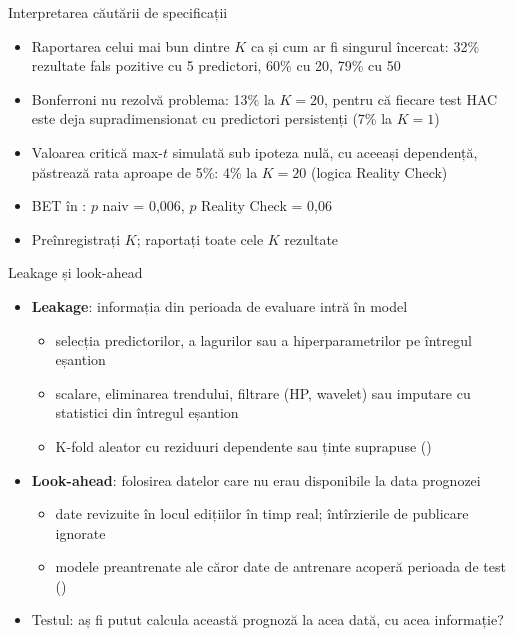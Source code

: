 \begin{frame}{Interpretarea căutării de specificații}
\itemsize{\small}
\begin{itemize}
    \item Raportarea celui mai bun dintre $K$ ca și cum ar fi singurul încercat: 32\% rezultate fals pozitive cu 5 predictori, 60\% cu 20, 79\% cu 50
    \item Bonferroni nu rezolvă problema: 13\% la $K = 20$, pentru că fiecare test HAC este deja supradimensionat cu predictori persistenți (7\% la $K = 1$)
    \item Valoarea critică max-$t$ simulată sub ipoteza nulă, cu aceeași dependență, păstrează rata aproape de 5\%: 4\% la $K = 20$ (logica Reality Check)
    \item BET în : $p$ naiv = 0{,}006, $p$ Reality Check = 0{,}06
    \item Preînregistrați $K$; raportați toate cele $K$ rezultate
\end{itemize}
\end{frame}

\begin{frame}{Leakage și look-ahead}
\itemsize{\small}
\begin{itemize}
    \item \textbf{Leakage}: informația din perioada de evaluare intră în model 
    \begin{itemize}
        \item selecția predictorilor, a lagurilor sau a hiperparametrilor pe întregul eșantion
        \item scalare, eliminarea trendului, filtrare (HP, wavelet) sau imputare cu statistici din întregul eșantion
        \item K-fold aleator cu reziduuri dependente sau ținte suprapuse ()
    \end{itemize}
    \item \textbf{Look-ahead}: folosirea datelor care nu erau disponibile la data prognozei
    \begin{itemize}
        \item date revizuite în locul edițiilor în timp real; întîrzierile de publicare ignorate
        \item modele preantrenate ale căror date de antrenare acoperă perioada de test ()
    \end{itemize}
    \item Testul: aș fi putut calcula această prognoză la acea dată, cu acea informație?
\end{itemize}
\end{frame}

